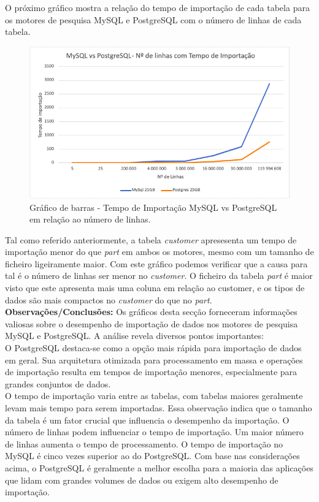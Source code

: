 \documentclass{article}
\begin{document}
O próximo gráfico mostra a relação do tempo de importação de cada tabela para os motores de pesquisa MySQL e PostgreSQL com o número de linhas de cada tabela.\\


\begin{figure}[H]
  \centering
  \includegraphics[width=\textwidth]{Graphs/RowsvsImportTime.png}
  \caption{Gráfico de barras - Tempo de Importação MySQL vs PostgreSQL em relação ao número de linhas.}
  \label{fig:row_import_time3}
\end{figure}

Tal como referido anteriormente, a tabela \textit{customer} apresesenta um tempo de importação menor do que \textit{part} em ambos os motores, mesmo com um tamanho de ficheiro ligeiramente maior. Com este gráfico podemos verificar que a causa para tal é o número de linhas ser menor no \textit{customer}. O ficheiro da tabela \textit{part} é maior visto que este apresenta mais uma coluna em relação ao customer, e os tipos de dados são mais compactos no \textit{customer} do que no \textit{part}.\\

\textbf{Observações/Conclusões:}
Os gráficos desta secção forneceram informações valiosas sobre o desempenho de importação de dados nos motores de pesquisa MySQL e PostgreSQL. A análise revela diversos pontos importantes:\\
O PostgreSQL destaca-se como a opção mais rápida para importação de dados em geral. Sua arquitetura otimizada para processamento em massa e operações de importação resulta em tempos de importação menores, especialmente para grandes conjuntos de dados.\\
O tempo de importação varia entre as tabelas, com tabelas maiores geralmente levam mais tempo para serem importadas. Essa observação indica que o tamanho da tabela é um fator crucial que influencia o desempenho da importação. O número de linhas podem influenciar o tempo de importação. Um maior número de linhas aumenta o tempo de processamento.
O tempo de importação no MySQL é cinco vezes superior ao do PostgreSQL.
Com base nas considerações acima, o PostgreSQL é geralmente a melhor escolha para a maioria das aplicações que lidam com grandes volumes de dados ou exigem alto desempenho de importação.
\end{document}

